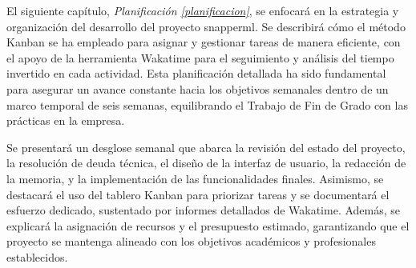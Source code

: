 El siguiente capítulo, \textit{Planificación \ref{planificacion}}, se enfocará en la estrategia y organización del desarrollo del proyecto \Gls{snapperml}. Se describirá cómo el método Kanban se ha empleado para asignar y gestionar tareas de manera eficiente, con el apoyo de la herramienta Wakatime para el seguimiento y análisis del tiempo invertido en cada actividad. Esta planificación detallada ha sido fundamental para asegurar un avance constante hacia los objetivos semanales dentro de un marco temporal de seis semanas, equilibrando el Trabajo de Fin de Grado con las prácticas en la empresa.

Se presentará un desglose semanal que abarca la revisión del estado del proyecto, la resolución de \gls{deuda} técnica, el diseño de la interfaz de usuario, la redacción de la memoria, y la implementación de las funcionalidades finales. Asimismo, se destacará el uso del tablero Kanban para priorizar tareas y se documentará el esfuerzo dedicado, sustentado por informes detallados de Wakatime. Además, se explicará la asignación de recursos y el presupuesto estimado, garantizando que el proyecto se mantenga alineado con los objetivos académicos y profesionales establecidos.